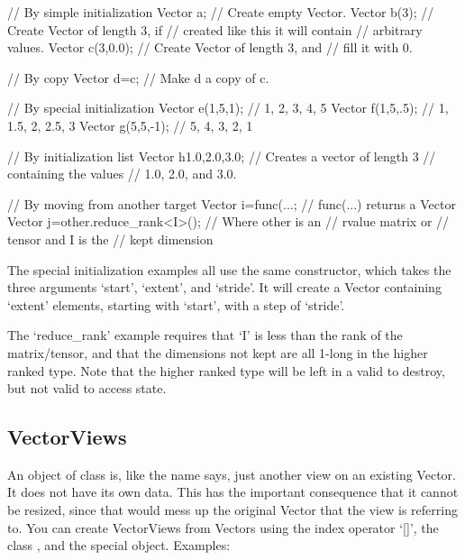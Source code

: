\begin{code}
// By simple initialization
Vector a;         // Create empty Vector.
Vector b(3);      // Create Vector of length 3, if
                  // created like this it will contain
                  // arbitrary values.
Vector c(3,0.0);  // Create Vector of length 3, and
                  // fill it with 0.

// By copy
Vector d=c;       // Make d a copy of c.

// By special initialization
Vector e(1,5,1);  // 1, 2, 3, 4, 5
Vector f(1,5,.5); // 1, 1.5, 2, 2.5, 3
Vector g(5,5,-1); // 5, 4, 3, 2, 1

// By initialization list
Vector h{1.0,2.0,3.0};  // Creates a vector of length 3
                        // containing the values
                        // 1.0, 2.0, and 3.0.

// By moving from another target
Vector i=func(...;  // func(...) returns a Vector
Vector j=other.reduce_rank<I>();  // Where other is an
                                  // rvalue matrix or
                                  // tensor and I is the
                                  // kept dimension
\end{code}

The special initialization examples all use the same constructor, which takes
the three arguments `start', `extent', and `stride'. It will create a
Vector containing `extent' elements, starting with `start', with a
step of `stride'.

The `reduce\_rank' example requires that `I' is less than the rank of the matrix/tensor,
and that the dimensions not kept are all 1-long in the higher ranked type.  Note that the
higher ranked type will be left in a valid to destroy, but not valid to access state.

\subsection{VectorViews}
\label{sec:vector_views}

An object of class  is, like the name says, just
another view on an existing Vector. It does not have its own
data. This has the important consequence that it cannot be resized,
since that would mess up the original Vector that the view is
referring to. You can create VectorViews from Vectors using the index
operator `[]', the class , and the special 
object. Examples:

